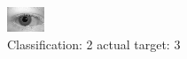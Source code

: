 \begin{figure}[h!]
\begin{center}
\includegraphics[width=0.60\columnwidth]{figures/ID639_class_2_target_3.png}
\end{center}
\caption{ Classification: 2 actual target: 3}
\label{fig:ID639_class_2_target_3}
\end{figure}
